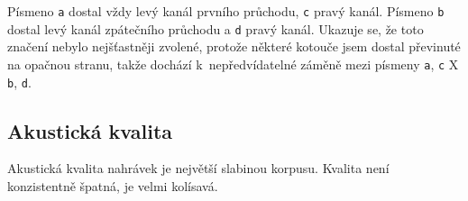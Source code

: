 Písmeno \texttt{a} dostal vždy levý kanál prvního průchodu, \texttt{c} pravý
kanál. Písmeno \texttt{b} dostal levý kanál zpátečního průchodu a \texttt{d}
pravý kanál. Ukazuje se, že toto značení nebylo nejšťastněji zvolené, protože
některé kotouče jsem dostal převinuté na opačnou stranu, takže dochází
k~nepředvídatelné záměně mezi písmeny \texttt{a}, \texttt{c} X \texttt{b},
\texttt{d}.

\subsection{Akustická kvalita}

Akustická kvalita nahrávek je největší slabinou korpusu. Kvalita není
konzistentně špatná, je velmi kolísavá.
